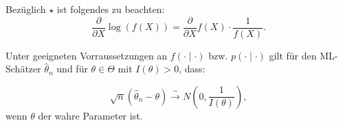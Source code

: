 \documentclass[10pt]{article}
\newcommand{\KV}{\overset{\sim} \longrightarrow} %
\begin{document}
	\begin{Bemerkung}
		Bezüglich $\star$ ist folgendes zu beachten:
		\begin{equation} \label{logab}
			\frac{\partial}{\partial X} \log (f(X)) = \frac{\partial}{\partial X} f(X) \cdot \frac{1}{f(X)}.
		\end{equation} 
	\end{Bemerkung}
	
	\begin{Satz}
		Unter geeigneten Vorraussetzungen an $f(\cdot \mid \cdot)$ bzw. $p(\cdot \mid \cdot)$ gilt für den ML-Schätzer $\hat{\theta}_n$ und für $\theta \in \Theta$ mit $I(\theta) > 0$, dass:
		
		\begin{equation*}
			\sqrt{n}(\hat{\theta}_n - \theta) \KV N\left(0,\frac{1}{I(\theta)}\right),
		\end{equation*}
		wenn $\theta$ der wahre Parameter ist. 
	\end{Satz}
	
\end{document}
